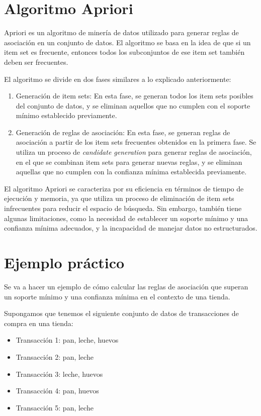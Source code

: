 \section{Algoritmo Apriori}

Apriori es un algoritmo de minería de datos utilizado para generar reglas de asociación en un conjunto de datos. El algoritmo se basa en la idea de que si un item set es frecuente, entonces todos los subconjuntos de ese item set también deben ser frecuentes. \cite{wiki:apriori}

El algoritmo se divide en dos fases similares a lo explicado anteriormente:

\begin{enumerate}
    \item Generación de item sets: En esta fase, se generan todos los item sets posibles del conjunto de datos, y se eliminan aquellos que no cumplen con el soporte mínimo establecido previamente.
    \item Generación de reglas de asociación: En esta fase, se generan reglas de asociación a partir de los item sets frecuentes obtenidos en la primera fase. Se utiliza un proceso de \textit{candidate generation} para generar reglas de asociación, en el que se combinan item sets para generar nuevas reglas, y se eliminan aquellas que no cumplen con la confianza mínima establecida previamente.
\end{enumerate}

El algoritmo Apriori se caracteriza por su eficiencia en términos de tiempo de ejecución y memoria, ya que utiliza un proceso de eliminación de item sets infrecuentes para reducir el espacio de búsqueda. Sin embargo, también tiene algunas limitaciones, como la necesidad de establecer un soporte mínimo y una confianza mínima adecuados, y la incapacidad de manejar datos no estructurados.

\cite{wiki:apriori}

\section{Ejemplo práctico}

Se va a hacer un ejemplo de cómo calcular las reglas de asociación que superan un soporte mínimo y una confianza mínima en el contexto de una tienda.

Supongamos que tenemos el siguiente conjunto de datos de transacciones de compra en una tienda:

\begin{itemize}
    \item Transacción 1: pan, leche, huevos
    \item Transacción 2: pan, leche
    \item Transacción 3: leche, huevos
    \item Transacción 4: pan, huevos
    \item Transacción 5: pan, leche
\end{itemize}

